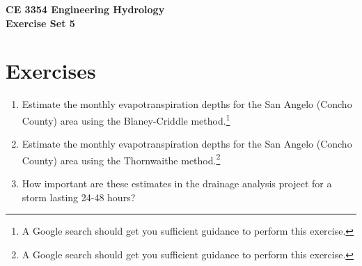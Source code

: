 \documentclass[12pt]{article}
\begin{document}
\begin{center}
{\textbf{{ CE 3354 Engineering Hydrology} \\ {Exercise Set 5}}}
\end{center}

 \section*{\small{Exercises}}
 \begin{enumerate}

\item Estimate the monthly evapotranspiration depths for the San Angelo (Concho County) area using the Blaney-Criddle method.\footnote{A Google search should get you sufficient guidance to perform this exercise.}

\item Estimate the monthly evapotranspiration depths for the San Angelo (Concho County) area using the Thornwaithe method.\footnote{A Google search should get you sufficient guidance to perform this exercise.}

\item How important are these estimates in the drainage analysis project for a storm lasting 24-48 hours?


\end{enumerate}
\end{document}
